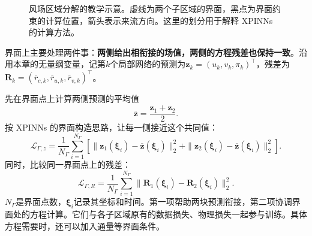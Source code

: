 \begin{figure}[htbp]
\centering
{}
\caption{风场区域分解的教学示意。虚线为两个子区域的界面，黑点为界面约束的计算位置，箭头表示来流方向。这里的划分用于解释 XPINNs 的计算方法。}
\label{fig:pinn-xpinn-domain}
\end{figure}

界面上主要处理两件事：\textbf{两侧给出相衔接的场值，两侧的方程残差也保持一致}。沿用本章的无量纲变量，记第$k$个局部网络的预测为$\mathbf z_k=(u_k,v_k,\pi_k)^\top$，残差为$\mathbf R_k=(\overline r_{c,k},\overline r_{u,k},\overline r_{v,k})^\top$。

先在界面点上计算两侧预测的平均值
\[
 \overline{\mathbf z}=\frac{\mathbf z_1+\mathbf z_2}{2}.
\]
按 XPINNs 的界面构造思路，让每一侧接近这个共同值：
\begin{equation}
 \mathcal L_{\Gamma,z}=\frac1{N_\Gamma}\sum_{i=1}^{N_\Gamma}
 \left[
 \|\mathbf z_1(\boldsymbol\xi_i)-\overline{\mathbf z}(\boldsymbol\xi_i)\|_2^2
 +\|\mathbf z_2(\boldsymbol\xi_i)-\overline{\mathbf z}(\boldsymbol\xi_i)\|_2^2
 \right].
 \label{eq:pinn-xpinn-interface-value}
\end{equation}
同时，比较同一界面点上的残差：
\begin{equation}
 \mathcal L_{\Gamma,R}=\frac1{N_\Gamma}\sum_{i=1}^{N_\Gamma}
 \|\mathbf R_1(\boldsymbol\xi_i)-\mathbf R_2(\boldsymbol\xi_i)\|_2^2.
 \label{eq:pinn-xpinn-interface-residual}
\end{equation}
$N_\Gamma$是界面点数，$\boldsymbol\xi_i$记录其坐标和时间。第一项帮助两块预测衔接，第二项协调界面处的方程计算。它们与各子区域原有的数据损失、物理损失一起参与训练。具体方程需要时，还可以加入通量等界面条件\cite{jagtap2020xpinn}。

